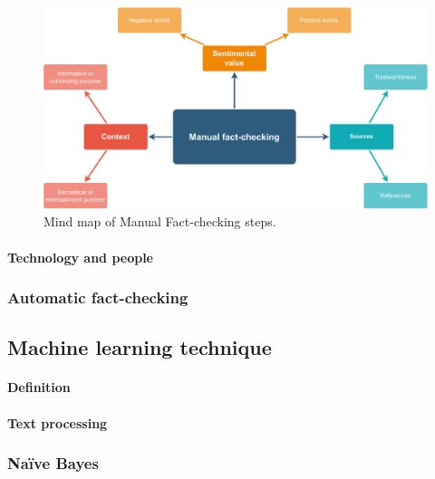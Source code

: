 \documentclass[11pt ,english,a4paper]{article}
\begin{document}
\begin{figure}[h]
\centering
\includegraphics[scale=0.5]{manual_factchecking.pdf}
\caption{Mind map of Manual Fact-checking steps.}
\label{f:man_fact}
\end{figure}

\paragraph{Technology and people}%

\subsubsection{Automatic fact-checking}\label{tech:fact:auto}
\cite{gu22fact}

\subsection{Machine learning technique} \label{tech:mach}

\paragraph{Definition}

\paragraph{Text processing}

\subsubsection{Naïve Bayes}
\end{document}
